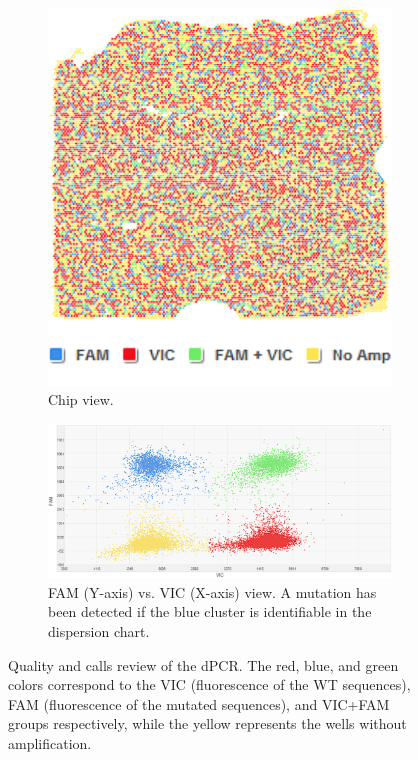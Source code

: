 \begin{enumerate}[font=\bfseries]
    \begin{figure}[t]
        \centering
        \begin{subfigure}{0.30\textwidth}
            \centering
            \includegraphics[width=\textwidth]{Images/chapter_3/FAM_VIC_chip.png}
            \caption{Chip view.}
            \label{fig:FAM_VIC_chip}
        \end{subfigure}
        \hfill
        \begin{subfigure}{0.69\textwidth}
            \centering
            \includegraphics[width=\textwidth]{Images/chapter_3/FAM_VIC.png}
            \caption{FAM\texttrademark{} (Y-axis) vs. VIC\texttrademark{} (X-axis) view. A mutation has been detected if the blue cluster is identifiable in the dispersion chart.}
            \label{fig:FAM_VIC_dispersion}
        \end{subfigure}
        \hfill
        \caption{Quality and calls review of the dPCR. The red, blue, and green colors correspond to the VIC\texttrademark{} (fluorescence of the WT sequences), FAM\texttrademark{} (fluorescence of the mutated sequences), and VIC\texttrademark{}+FAM\texttrademark{} groups respectively, while the yellow represents the wells without amplification.}
        \label{fig:FAM_VIC}
    \end{figure}
\end{enumerate}

